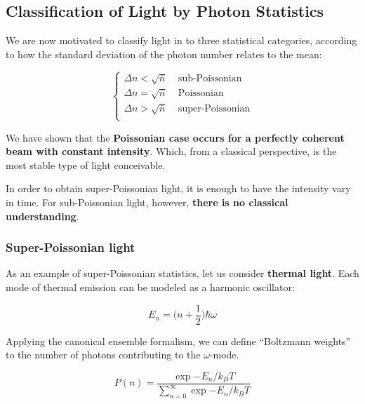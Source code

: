\documentclass[12pt,a4paper]{report}
\begin{document}
\subsection{Classification of Light by Photon Statistics}

We are now motivated to classify light in to three statistical categories, according to how the standard deviation of the photon number relates to the mean:

\begin{equation}
    \begin{cases}
        \Delta n<\sqrt{\bar{n}}\;\;\;\;\text{sub-Poissonian}\\
        \Delta n=\sqrt{\bar{n}}\;\;\;\;\text{Poissonian}\\
        \Delta n>\sqrt{\bar{n}}\;\;\;\;\text{super-Poissonian}\\
    \end{cases}
\end{equation}

We have shown that the \textbf{Poissonian case occurs for a perfectly coherent beam with constant intensity}. Which, from a classical perspective, is the most stable type of light conceivable.

In order to obtain super-Poissonian light, it is enough to have the intensity vary in time. For sub-Poissonian light, however, \textbf{there is no classical understanding}.

\subsubsection{Super-Poissonian light}

As an example of super-Poissonian statistics, let us consider \textbf{thermal light}. Each mode of thermal emission can be modeled as a harmonic oscillator:

\begin{equation}
    E_n=\Big(n+\frac{1}{2}\Big)\hbar\omega
\end{equation}


Applying the canonical ensemble formalism, we can define ``Boltzmann weights'' to the number of photons contributing to the $\omega$-mode.

\begin{equation}
    P(n)=\frac{\exp{-E_n/k_BT}}{\sum_{n=0}^{\infty}\exp{-E_n/k_BT}}
\end{equation}
\end{document}
